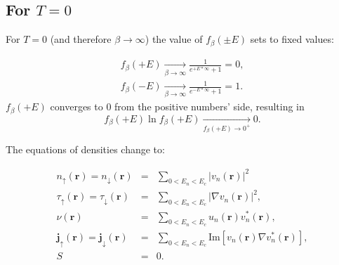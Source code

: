 \documentclass[a4paper,10pt]{article}
\newcommand{\abs}[1]{\lvert{#1}\rvert}            %
\begin{document}
\subsection{For $T=0$}

For $T = 0$ (and therefore $\beta \to \infty$) the value of $f_\beta (\pm E)$ sets to fixed values:

\begin{eqnarray}
f_{\beta}(+E) \xrightarrow[\beta \to \infty]{} \frac{1}{e^{+E * \infty}+1} = 0, \\
f_{\beta}(-E) \xrightarrow[\beta \to \infty]{} \frac{1}{e^{-E * \infty}+1} = 1.
\label{eqn:distributions}
\end{eqnarray}
$f_{\beta}(+E)$ converges to $0$ from the positive numbers' side, resulting in 
\begin{equation}
    f_{\beta}(+E)\ln {f_{\beta}(+E)} \xrightarrow[f_{\beta}(+E) \to 0^+]{} 0.
\end{equation}

The equations of densities change to:

\begin{eqnarray}
n_{\uparrow}(\bm{r})=n_{\downarrow}(\bm{r}) &=& \sum_{0<E_n<E_c}\abs{v_{n}(\bm{r})}^2\\
\tau_{\uparrow}(\bm{r})=\tau_{\downarrow}(\bm{r}) &=& \sum_{0<E_n<E_c}\abs{\nabla v_{n}(\bm{r})}^2,\\
\nu(\bm{r}) &=& \sum_{0<E_n<E_c} u_{n}(\bm{r})v_{n}^{*}(\bm{r}),\\
\bm{j}_{\uparrow}(\bm{r})=\bm{j}_{\downarrow}(\bm{r}) &=& \sum_{0<E_n<E_c}\textrm{Im}[v_{n}(\bm{r})\nabla v_{n}^*(\bm{r})],\\
S&=&0.
\label{eqn:densities3}
\end{eqnarray}
\end{document}
